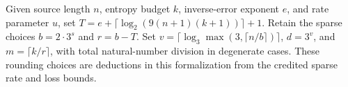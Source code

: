 \begin{definition}
  \label{def:lowerbounds-algebraic-explicit-condenser-parameters}
  \leanok
  Given source length $n$, entropy budget $k$, inverse-error exponent $e$,
  and rate parameter $u$, set
  $T=e+\lceil\log_2(9(n+1)(k+1))\rceil+1$.
  Retain the sparse choices $b=2\cdot3^s$ and $r=b-T$.
  Set $v=\lceil\log_3\max(3,\lceil n/b\rceil)\rceil$,
  $d=3^v$, and $m=\lceil k/r\rceil$, with total natural-number
  division in degenerate cases. These rounding choices are deductions
  in this formalization from the credited sparse rate and loss bounds.
\end{definition}

